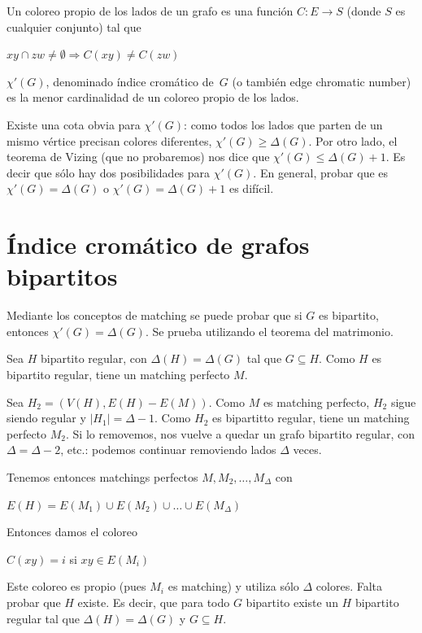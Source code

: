 \documentclass[10pt,a4paper]{article}
\begin{document}
Un coloreo propio de los lados de un grafo es una función $C: E \rightarrow S$ (donde $S$ es cualquier conjunto) tal que

\begin{center}
$xy \cap zw \neq \emptyset \Rightarrow C(xy) \neq C(zw)$
\end{center}

$\chi'(G)$, denominado índice cromático de $G$ (o también edge chromatic number) es la menor cardinalidad de un coloreo propio de los lados.

Existe una cota obvia para $\chi'(G)$: como todos los lados que parten de un mismo vértice precisan colores diferentes, $\chi'(G) \geq \Delta(G)$. Por otro lado, el teorema de Vizing (que no probaremos) nos dice que $\chi'(G) \leq \Delta(G) + 1$. Es decir que sólo hay dos posibilidades para $\chi'(G)$. En general, probar que es $\chi'(G) = \Delta(G)$ o $\chi'(G) = \Delta(G) + 1$ es difícil.

\section*{Índice cromático de grafos bipartitos}

Mediante los conceptos de matching se puede probar que si $G$ es bipartito, entonces $\chi'(G) = \Delta(G)$. Se prueba utilizando el teorema del matrimonio.

Sea $H$ bipartito regular, con $\Delta(H) = \Delta(G)$ tal que $G \subseteq H$. Como $H$ es bipartito regular, tiene un matching perfecto $M$.

Sea $H_2 = (V(H), E(H) - E(M))$. Como $M$ es matching perfecto, $H_2$ sigue siendo regular y $\lvert H_1\rvert = \Delta - 1$. Como $H_2 $ es bipartitto regular, tiene un matching perfecto $M_2$. Si lo removemos, nos vuelve a quedar un grafo bipartito regular, con $\Delta = \Delta - 2$, etc.: podemos continuar removiendo lados $\Delta$ veces.

Tenemos entonces matchings perfectos $M, M_2, \dots, M_\Delta$ con

\begin{center}
$E(H) = E(M_1) \cup E(M_2) \cup \dots \cup E(M_\Delta)$
\end{center}

Entonces damos el coloreo

\begin{center}
$C(xy) = i$ si $xy \in E(M_i)$
\end{center}

Este coloreo es propio (pues $M_i$ es matching) y utiliza sólo $\Delta$ colores. Falta probar que $H$ existe. Es decir, que para todo $G$ bipartito existe un $H$ bipartito regular tal que $\Delta(H) = \Delta (G)$ y $G \subseteq H$.
\end{document}
